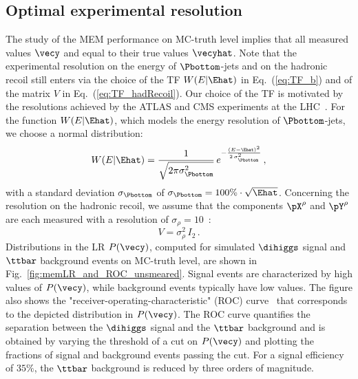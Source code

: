 \subsection{Optimal experimental resolution}

The study of the MEM performance on MC-truth level implies that all measured values $\vecy$ and equal to their true values $\vecyhat$.
Note that the experimental resolution on the energy of $\Pbottom$-jets and on the hadronic recoil still enters via the choice of the TF $W(E|\Ehat)$ in Eq.~(\ref{eq:TF_b})
and of the matrix $V$ in Eq.~(\ref{eq:TF_hadRecoil}).
Our choice of the TF is motivated by the resolutions achieved by the ATLAS and CMS experiments at the LHC~\cite{Aaboud:2017aca,PRF-14-001,Aaboud:2018tkc,JME-17-001}.
For the function $W(E|\Ehat)$, which models the energy resolution of $\Pbottom$-jets,
we choose a normal distribution:
\begin{equation}
W(E|\Ehat) = \frac{1}{\sqrt{2 \pi \sigma_{\Pbottom}^{2}}} \, e^{-\frac{(E - \Ehat)^{2}}{2 \, \sigma_{\Pbottom}^{2}}} \, ,
\label{eq:resolution_b}
\end{equation}
with a standard deviation $\sigma_{\Pbottom}$ of $\sigma_{\Pbottom} = 100\% \cdot \sqrt{\Ehat}$.
Concerning the resolution on the hadronic recoil,
we assume that the components $\pX^{\rho}$ and $\pY^{\rho}$ are each measured with a resolution of $\sigma_{\rho} = 10$~\GeV:
\begin{equation}
V = \sigma_{\rho}^{2} \, I_{2} \, .
\label{eq:resolution_rho}
\end{equation}
Distributions in the LR $P(\vecy)$, computed for simulated $\dihiggs$ signal and $\ttbar$ background events on MC-truth level, are shown in Fig.~\ref{fig:memLR_and_ROC_unsmeared}.
Signal events are characterized by high values of $P(\vecy)$, while background events typically have low values.
The figure also shows the "receiver-operating-characteristic" (ROC) curve~\cite{ROCcurve} that corresponds to the depicted distribution in $P(\vecy)$.
The ROC curve quantifies the separation between the $\dihiggs$ signal and the $\ttbar$ background
and is obtained by varying the threshold of a cut on $P(\vecy)$ and plotting the fractions of signal and background events passing the cut.
For a signal efficiency of $35\%$, the $\ttbar$ background is reduced by three orders of magnitude.

